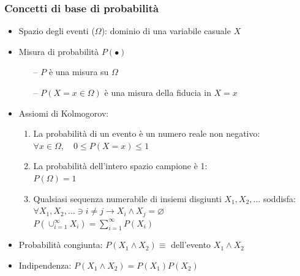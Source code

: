 \begin{frame}
	
	\frametitle{Concetti di base di probabilità}
	
		\begin{itemize}
			\item Spazio degli eventi ($\Omega$): dominio di una variabile casuale $X$
			\item Misura di probabilità $P(\bullet)$
				\begin{itemize}
					\item[--] $P$ è una misura su $\Omega$
					\item[--] $P(X = x \in \Omega)$ è una misura della fiducia in $X = x$
				\end{itemize}
			\item Assiomi di Kolmogorov:
				\begin{enumerate}
					\item La probabilità di un evento è un numero reale non negativo:\\
						$\forall x \in \Omega, \quad 0 \leq P(X = x) \leq 1$
					\item La probabilità dell'intero spazio campione è 1:\\
						$P(\Omega) = 1$
					\item Qualsiasi sequenza numerabile di insiemi disgiunti  $X_1, X_2, \dots$ soddisfa:\\
						$\forall X_1, X_2,\dots \ni i \neq j \rightarrow X_i \land X_j = \varnothing$\\
						$P \left( \cup_{i=1}^{\infty} X_i \right) = \sum_{i=1}^{\infty} P(X_i)$
				\end{enumerate}
			\item Probabilità congiunta: $P(X_1 \land X_2) \equiv$ dell’evento $X_1 \land X_2$
			\item Indipendenza: $P(X_1 \land X_2) = P(X_1)P(X_2)$
		\end{itemize}
	
\end{frame}


